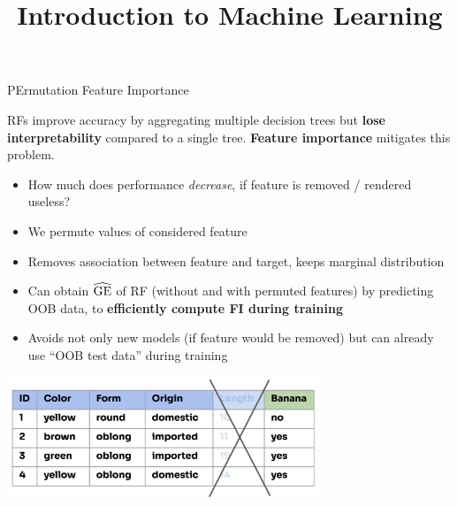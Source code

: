 \documentclass[11pt,compress,t,notes=noshow, xcolor=table]{beamer}
\title{Introduction to Machine Learning}
\begin{document}

\begin{vbframe}{PErmutation Feature Importance}

  \begin{footnotesize}

RFs improve accuracy by aggregating multiple decision trees but \textbf{lose interpretability} compared to a single tree. \textbf{Feature importance} mitigates this problem.
\begin{itemize}
  \item How much does performance \textit{decrease}, if feature is removed / rendered useless?
  \item We permute values of considered feature
  \item Removes association between feature and target, keeps marginal distribution
  \item Can obtain $\widehat{\mathrm{GE}}$ of RF (without and with permuted features)
    by predicting OOB data, to \textbf{efficiently compute FI during training}
  \item Avoids not only new models (if feature would be removed) but can already use ``OOB test data''
    during training
\end{itemize}
\end{footnotesize}

\vspace{-1ex}
\begin{center}
\includegraphics[width=0.7\textwidth]{figure_man/forest-fimp_idea.png}
\end{center}

\end{vbframe}
\end{document}

